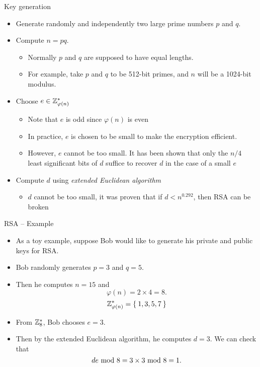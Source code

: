 \begin{frame}{Key generation}
    \begin{itemize}
        \item Generate randomly and independently two large prime numbers $p$ and $q$.
         \item Compute $n=pq$.
         \begin{itemize}
             \item Normally $p$ and $q$ are supposed to have equal lengths.
             \item For example, take $p$ and $q$ to be 512-bit primes, and $n$ will be a 1024-bit modulus.
         \end{itemize}
          \item Choose $e\in{\mathbb Z}_{\varphi(n)}^*$
          \begin{itemize}
              \item Note that $e$ is odd since $\varphi(n)$ is even
              \item In practice, $e$ is chosen to be small to make the encryption efficient.
              \item However, $e$ cannot be too small. It has been shown that only the $n/4$ least significant bits of $d$ suffice to recover $d$ in the case of a small $e$
        \end{itemize}
      \item Compute $d$ using \textit{extended Euclidean algorithm}
     \begin{itemize}
         \item $d$ cannot be too small, it was proven that if $d<n^{0.292}$, then RSA can be broken
     \end{itemize}
    \end{itemize}
\end{frame}

\begin{frame}{RSA -- Example}
\begin{example}
\begin{itemize}
    \item As a toy example, suppose Bob would like to generate his private and public keys for RSA.
    \item Bob randomly generates $p=3$ and $q=5$.
    \item Then he computes $n=15$ and 
\[
\varphi(n)=2\times4=8.
\]
\[
{\mathbb Z}_{\varphi(n)}^*=\Set{1,3,5,7}
\]
\item From ${\mathbb Z}_{8}^*$, Bob chooses $e=3$.
\item Then by the extended Euclidean algorithm, he computes $d=3$.
We can check that
\[
de\textrm{~mod~}8=3\times3\textrm{~mod~} 8=1.
\]
\end{itemize}
\end{example}
\end{frame}

